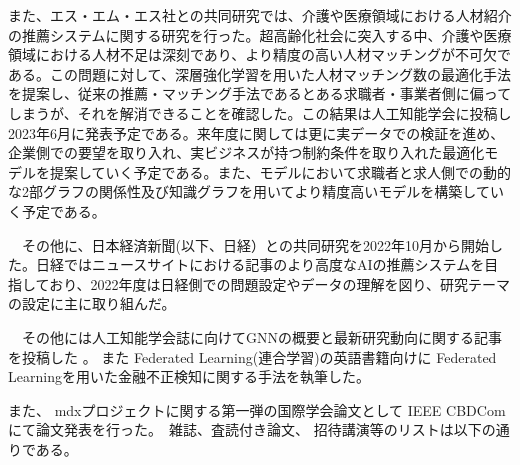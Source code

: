 また、エス・エム・エス社との共同研究では、介護や医療領域における人材紹介の推薦システムに関する研究を行った。超高齢化社会に突入する中、介護や医療領域における人材不足は深刻であり、より精度の高い人材マッチングが不可欠である。この問題に対して、深層強化学習を用いた人材マッチング数の最適化手法を提案し、従来の推薦・マッチング手法であるとある求職者・事業者側に偏ってしまうが、それを解消できることを確認した。この結果は人工知能学会に投稿し2023年6月に発表予定である\cite{sms}。来年度に関しては更に実データでの検証を進め、企業側での要望を取り入れ、実ビジネスが持つ制約条件を取り入れた最適化モデルを提案していく予定である。また、モデルにおいて求職者と求人側での動的な2部グラフの関係性及び知識グラフを用いてより精度高いモデルを構築していく予定である。

　その他に、日本経済新聞(以下、日経）との共同研究を2022年10月から開始した。日経ではニュースサイトにおける記事のより高度なAIの推薦システムを目指しており、2022年度は日経側での問題設定やデータの理解を図り、研究テーマの設定に主に取り組んだ。


　その他には人工知能学会誌に向けてGNNの概要と最新研究動向に関する記事を投稿した \cite{jsai-gnn}。 また Federated Learning(連合学習)の英語書籍向けに Federated Learningを用いた金融不正検知に関する手法を執筆した\cite{fl-book}。 
 
 また、 mdxプロジェクトに関する第一弾の国際学会論文として IEEE CBDCom\cite{mdx}にて論文発表を行った。　雑誌、査読付き論文、 招待講演等のリストは以下の通りである。










